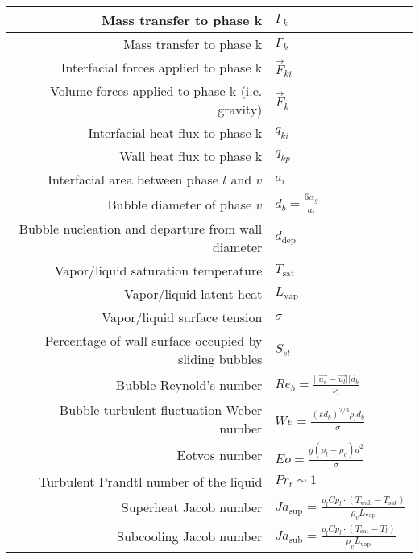 \documentclass[a4paper,12pt]{report}
\renewcommand{\vec}{\overrightarrow}
\begin{document}
\begin{center}
\begin{tabular}{|r|l|}
	Mass transfer to phase k
		& $\Gamma_k $ \\ \hline
	Mass transfer to phase k
		& $\Gamma_k $ \\ \hline
	Interfacial forces applied to phase k
		& $\vec{F}_{ki}$  \\ \hline
	Volume forces applied to phase k (i.e. gravity)
		& $\vec{F}_k$  \\ \hline
	Interfacial heat flux to phase k
		& $q_{ki}$ \\ \hline
	Wall heat flux to phase k
		& $q_{kp} $ \\ \hline
	Interfacial area between phase $l$ and $v$
		& $a_i$ \\ \hline
	Bubble diameter of phase $v$
		& $	d_b = \frac{6 \alpha_g}{a_i} $ \\ \hline
	Bubble nucleation and departure from wall diameter
		& $d_\text{dep}$ \\ \hline
	Vapor/liquid saturation temperature
		& $T_\text{sat}$ \\ \hline
	Vapor/liquid latent heat
		& $L_\text{vap}$ \\ \hline
	Vapor/liquid surface tension
		& $\sigma$ \\ \hline
	Percentage of wall surface occupied by sliding bubbles
		& $S_{sl}$ \\ \hline
	Bubble Reynold's number
		& $Re_b = \frac{||\overrightarrow{u_v}-\overrightarrow{u_l}|| d_b}{\nu_l}$ \\ \hline
	Bubble turbulent fluctuation Weber number
		& $We = \frac{(\varepsilon d_b)^{2/3} \rho_l d_b}{\sigma}$ \\ \hline
	Eotvos number
		&  $Eo = \frac{g(\rho_l-\rho_g)d^2}{\sigma}$ \\ \hline
	Turbulent Prandtl number of the liquid
		& $Pr_t \sim 1 $ \\ \hline
	Superheat Jacob number
		& $Ja_\text{sup} = \frac{\rho_l Cp_l \cdot (T_\text{wall} - T_\text{sat})}{\rho_v L_\text{vap}}$ \\ \hline
	Subcooling Jacob number
		& $Ja_\text{sub} = \frac{\rho_l Cp_l \cdot (T_\text{sat} - T_l)}{\rho_v L_\text{vap}}$ \\ \hline
\end{tabular}
\end{center}

\pagebreak


\cleardoublepage

\cleardoublepage


\cleardoublepage
\end{document}
